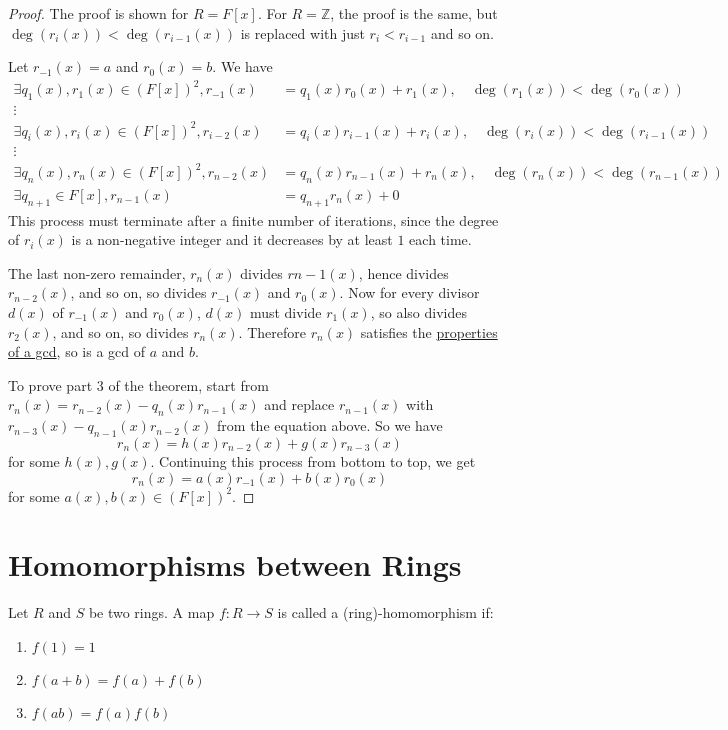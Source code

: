 \documentclass[12pt,a4paper]{article}
\theoremstyle{definition}
\begin{document}
\begin{proof}
	The proof is shown for $R = F[x]$. For $R = \mathbb{Z}$, the proof is the same, but $\deg(r_i(x)) < \deg(r_{i - 1}(x))$ is replaced with just $r_i < r_{i - 1}$ and so on.

	Let $r_{-1} (x) = a$ and $r_0(x) = b$. We have
	\[
		\begin{aligned}
			\exists q_1(x), r_1(x) \in {(F[x])}^2, r_{-1}(x) & = q_1(x) r_0(x) + r_1(x), \quad \deg(r_1(x)) < \deg(r_0(x)) \\
			\vdots \\
			\exists q_i(x), r_i(x) \in {(F[x])}^2, r_{i - 2}(x) & = q_i(x) r_{i - 1}(x) + r_i(x), \quad \deg(r_i(x)) < \deg(r_{i - 1}(x)) \\
			\vdots \\
			\exists q_n(x), r_n(x) \in {(F[x])}^2, r_{n - 2}(x) & = q_n(x) r_{n - 1}(x) + r_n(x), \quad \deg(r_n(x)) < \deg(r_{n - 1}(x)) \\
			\exists q_{n + 1} \in F[x], r_{n - 1}(x) & = q_{n + 1}r_n(x) + 0
		\end{aligned}
	\]
	This process must terminate after a finite number of iterations, since the degree of $r_i(x)$ is a non-negative integer and it decreases by at least $1$ each time.

	The last non-zero remainder, $r_n(x)$ divides $r{n - 1}(x)$, hence divides $r_{n - 2}(x)$, and so on, so divides $r_{-1}(x)$ and $r_0(x)$. Now for every divisor $d(x)$ of $r_{-1}(x)$ and $r_0(x)$, $d(x)$ must divide $r_1(x)$, so also divides $r_2(x)$, and so on, so divides $r_n(x)$. Therefore $r_n(x)$ satisfies the \hyperref[def:gcd]{properties of a gcd}, so is a gcd of $a$ and $b$.

	To prove part 3 of the theorem, start from $r_n(x) = r_{n - 2}(x) - q_n(x) r_{n - 1}(x)$ and replace $r_{n - 1}(x)$ with $r_{n - 3}(x) - q_{n - 1}(x) r_{n - 2}(x)$ from the equation above. So we have
	\[
		r_n(x) = h(x) r_{n - 2}(x) + g(x) r_{n - 3}(x)
	\]
	for some $h(x), g(x)$. Continuing this process from bottom to top, we get
	\[
		r_n(x) = a(x) r_{-1} (x) + b(x) r_0 (x)
	\]
	for some $a(x), b(x) \in {(F[x])}^2$.
\end{proof}

\section{Homomorphisms between Rings}	

Let $R$ and $S$ be two rings. A map $f: R \rightarrow S$ is called a (ring)-homomorphism if:
\begin{enumerate}
	\item $f(1) = 1$
	\item $f(a + b) = f(a) + f(b)$
	\item $f(ab) = f(a)f(b)$
\end{enumerate}
\end{document}
